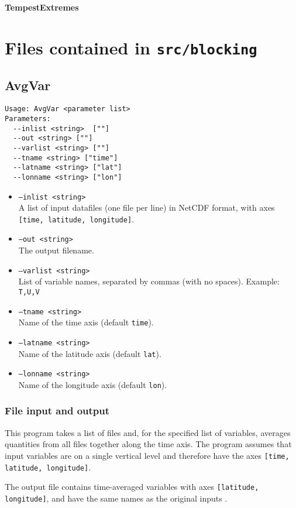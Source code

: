 \documentclass{article}
\begin{document}
{\Huge \textbf{TempestExtremes}}
\section{Files contained in \texttt{src/blocking}}
\subsection{AvgVar}
\begin{verbatim}
Usage: AvgVar <parameter list>
Parameters:
  --inlist <string>  [""]
  --out <string> [""]
  --varlist <string> [""]
  --tname <string> ["time"]
  --latname <string> ["lat"]
  --lonname <string> ["lon"]
\end{verbatim}

\begin{itemize}
\item[]\texttt{--inlist <string>} \\ A list of input datafiles (one file per line) in NetCDF format, with axes \texttt{[time, latitude, longitude]}. 
\item[] \texttt{--out <string>}\\ The output filename.
\item[] \texttt{--varlist <string>}\\ List of variable names, separated by commas (with no spaces). Example: \texttt{T,U,V}
\item[] \texttt{--tname <string>}\\Name of the time axis (default \texttt{time}).
\item[]\texttt{--latname <string>}\\Name of the latitude axis (default \texttt{lat}).
\item[]\texttt{--lonname <string>}\\Name of the longitude axis (default \texttt{lon}).
\end{itemize}

\subsubsection{File input and output}
This program takes a list of files and, for the specified list of variables, averages quantities from all files together along the time axis. The program assumes that input variables are on a single vertical level and therefore have the axes \texttt{[time, latitude, longitude]}. 

The output file contains time-averaged variables  with axes \texttt{[latitude, longitude]}, and have the same names as the original inputs . 
\end{document}
